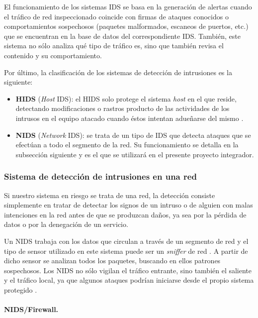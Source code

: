 El funcionamiento de los sistemas IDS se basa en la generación de alertas cuando
el tráfico de red inspeccionado coincide con firmas de ataques conocidos o
comportamientos sospechosos (paquetes malformados, escaneos de puertos, etc.)
que se encuentran en la base de datos del correspondiente IDS. También, este
sistema no sólo analiza qué tipo de tráfico es, sino que también revisa el
contenido y su comportamiento.

Por último, la clasificación de los sistemas de detección de intrusiones es la
siguiente:
\begin{itemize}
\item \textbf{HIDS} (\textit{Host} IDS): el HIDS solo protege el sistema
  \textit{host} en el que reside, detectando modificaciones o rastros producto de
  las actividades de los intrusos en el equipo atacado cuando éstos intentan
  adueñarse del mismo \parencite{ids_toolkit}.
\item \textbf {NIDS} (\textit{Network} IDS): se trata de un tipo de IDS que
  detecta ataques que se efectúan a todo el segmento de la red. Su
  funcionamiento se detalla en la subsección siguiente y es el que se utilizará
  en el presente proyecto integrador.
\end{itemize}

\subsubsection* {Sistema de detección de intrusiones en una red} \label{sec:NIDS}

Si nuestro sistema en riesgo se trata de una red, la detección consiste
simplemente en tratar de detectar los signos de un intruso o de alguien con
malas intenciones en la red antes de que se produzcan daños, ya sea por la
pérdida de datos o por la denegación de un servicio.

Un NIDS trabaja con los datos que circulan a través de un segmento de red y el
tipo de sensor utilizado en este sistema puede ser un \textit{sniffer} de red
\parencite{ids_toolkit}\parencite{ids_snort}. A partir de dicho sensor se
analizan todos los paquetes, buscando en ellos patrones sospechosos. Los NIDS no
sólo vigilan el tráfico entrante, sino también el saliente y el tráfico local,
ya que algunos ataques podrían iniciarse desde el propio sistema protegido
\parencite{ids_snort}.


\paragraph {NIDS/Firewall.}

